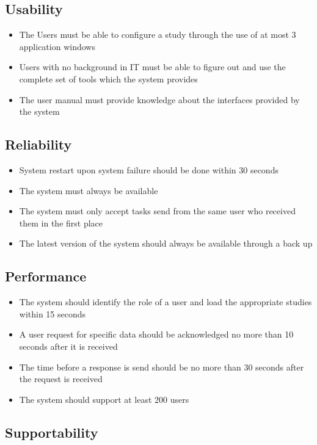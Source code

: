 \subsection{Usability}

\begin{itemize}
\item The Users must be able to configure a study through the use of at most 3 application windows
\item Users with no background in IT must be able to figure out and use the complete set of tools which the system provides
\item The user manual must provide knowledge about the interfaces provided by the system
\end{itemize}

\subsection{Reliability}

\begin{itemize}
\item System restart upon system failure should be done within 30 seconds
\item The system must always be available
\item The system must only accept tasks send from the same user who received them in the first place
\item The latest version of the system should always be available through a back up
\end{itemize}

\subsection{Performance}

\begin{itemize}
\item The system should identify the role of a user and load the appropriate studies within 15 seconds
\item A user request for specific data should be acknowledged no more than 10 seconds after it is received
\item The time before a response is send should be no more than 30 seconds after the request is received
\item The system should support at least 200 users
\end{itemize}

\subsection{Supportability}

